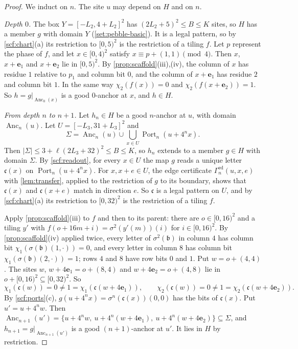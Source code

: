 \begin{proof}
We induct on $n$. The site $u$ may depend on $H$ and on $n$.

\emph{Depth $0$.} The box $Y=[-L_2,4+L_2]^2$ has $(2L_2+5)^2\le B\le K$ sites, so $H$ has a member $g$ with domain $Y$ (\cref{set:pebble-basic}). It is a legal pattern, so by \cref{scf:chart}(a) its restriction to $[0,5)^2$ is the restriction of a tiling $f$. Let $p$ represent the phase of $f$, and let $x\in[0,4)^2$ satisfy $x\equiv p+(1,1)\pmod4$. Then $x$, $x+\mathbf e_1$ and $x+\mathbf e_2$ lie in $[0,5)^2$. By \cref{prop:scaffold}(iii),(iv), the column of $x$ has residue $1$ relative to $p_1$ and column bit $0$, and the column of $x+\mathbf e_1$ has residue $2$ and column bit $1$. In the same way $\chi_2(f(x))=0$ and $\chi_2(f(x+\mathbf e_2))=1$. So $h=g|_{\operatorname{Anc}_0(x)}$ is a good $0$-anchor at $x$, and $h\in H$.

\emph{From depth $n$ to $n+1$.} Let $h_n\in H$ be a good $n$-anchor at $u$, with domain $\operatorname{Anc}_n(u)$. Let $U=[-L_3,31+L_3]^2$ and
\[
\Sigma=\operatorname{Anc}_n(u)\cup\bigcup_{x\in U}\operatorname{Port}_n(u+4^nx).
\]
Then $|\Sigma|\le3+\ell(2L_3+32)^2\le B\le K$, so $h_n$ extends to a member $g\in H$ with domain $\Sigma$. By \cref{scf:readout}, for every $x\in U$ the map $g$ reads a unique letter $\mathfrak c(x)$ on $\operatorname{Port}_n(u+4^nx)$. For $x,x+e\in U$, the edge certificate $\Gamma^{\mathrm{ed}}_n(u,x,e)$ with \cref{lem:transfer}, applied to the restriction of $g$ to its boundary, shows that $\mathfrak c(x)$ and $\mathfrak c(x+e)$ match in direction $e$. So $\mathfrak c$ is a legal pattern on $U$, and by \cref{scf:chart}(a) its restriction to $[0,32)^2$ is the restriction of a tiling $f$.

Apply \cref{prop:scaffold}(iii) to $f$ and then to its parent: there are $o\in[0,16)^2$ and a tiling $y'$ with $f(o+16m+i)=\sigma^2(y'(m))(i)$ for $i\in[0,16)^2$. By \cref{prop:scaffold}(iv) applied twice, every letter of $\sigma^2(\mathfrak b)$ in column $4$ has column bit $\chi_1(\sigma(\mathfrak b)(1,\cdot))=0$, and every letter in column $8$ has column bit $\chi_1(\sigma(\mathfrak b)(2,\cdot))=1$; rows $4$ and $8$ have row bits $0$ and $1$. Put $w=o+(4,4)$. The sites $w$, $w+4\mathbf e_1=o+(8,4)$ and $w+4\mathbf e_2=o+(4,8)$ lie in $o+[0,16)^2\subseteq[0,32)^2$. So
\[
\chi_1(\mathfrak c(w))=0\ne1=\chi_1(\mathfrak c(w+4\mathbf e_1)),\qquad \chi_2(\mathfrak c(w))=0\ne1=\chi_2(\mathfrak c(w+4\mathbf e_2)).
\]
By \cref{scf:ports}(c), $g(u+4^nx)=\sigma^n(\mathfrak c(x))(0,0)$ has the bits of $\mathfrak c(x)$. Put $u'=u+4^nw$. Then $\operatorname{Anc}_{n+1}(u')=\{u+4^nw,\ u+4^n(w+4\mathbf e_1),\ u+4^n(w+4\mathbf e_2)\}\subseteq\Sigma$, and $h_{n+1}=g|_{\operatorname{Anc}_{n+1}(u')}$ is a good $(n+1)$-anchor at $u'$. It lies in $H$ by restriction.
\end{proof}

